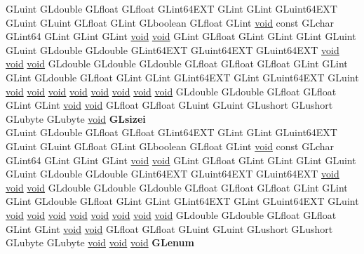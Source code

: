 \begin{DoxyCompactItemize}
\begin{tabbing}
\>GLuint GLdouble GLfloat GLfloat GLint64EXT GLint GLint GLuint64EXT GLuint GLuint GLfloat GLint GLboolean GLfloat GLint \hyperlink{interfacevoid}{void} const GLchar GLint64 GLint GLint GLint \hyperlink{interfacevoid}{void} \hyperlink{interfacevoid}{void} GLint GLfloat GLint GLint GLint GLuint GLuint GLdouble GLdouble GLint64EXT GLuint64EXT GLuint64EXT \hyperlink{interfacevoid}{void} \hyperlink{interfacevoid}{void} \hyperlink{interfacevoid}{void} GLdouble GLdouble GLdouble GLfloat GLfloat GLfloat GLint GLint GLint GLdouble GLfloat GLint GLint GLint64EXT GLint GLuint64EXT GLuint \hyperlink{interfacevoid}{void} \hyperlink{interfacevoid}{void} \hyperlink{interfacevoid}{void} \hyperlink{interfacevoid}{void} \hyperlink{interfacevoid}{void} \hyperlink{interfacevoid}{void} \hyperlink{interfacevoid}{void} \hyperlink{interfacevoid}{void} GLdouble GLdouble GLfloat GLfloat GLint GLint \hyperlink{interfacevoid}{void} \hyperlink{interfacevoid}{void} GLfloat GLfloat GLuint GLuint GLushort GLushort GLubyte GLubyte \hyperlink{interfacevoid}{void} {\bfseries GLsizei}\\
\>GLuint GLdouble GLfloat GLfloat GLint64EXT GLint GLint GLuint64EXT GLuint GLuint GLfloat GLint GLboolean GLfloat GLint \hyperlink{interfacevoid}{void} const GLchar GLint64 GLint GLint GLint \hyperlink{interfacevoid}{void} \hyperlink{interfacevoid}{void} GLint GLfloat GLint GLint GLint GLuint GLuint GLdouble GLdouble GLint64EXT GLuint64EXT GLuint64EXT \hyperlink{interfacevoid}{void} \hyperlink{interfacevoid}{void} \hyperlink{interfacevoid}{void} GLdouble GLdouble GLdouble GLfloat GLfloat GLfloat GLint GLint GLint GLdouble GLfloat GLint GLint GLint64EXT GLint GLuint64EXT GLuint \hyperlink{interfacevoid}{void} \hyperlink{interfacevoid}{void} \hyperlink{interfacevoid}{void} \hyperlink{interfacevoid}{void} \hyperlink{interfacevoid}{void} \hyperlink{interfacevoid}{void} \hyperlink{interfacevoid}{void} \hyperlink{interfacevoid}{void} GLdouble GLdouble GLfloat GLfloat GLint GLint \hyperlink{interfacevoid}{void} \hyperlink{interfacevoid}{void} GLfloat GLfloat GLuint GLuint GLushort GLushort GLubyte GLubyte \hyperlink{interfacevoid}{void} \hyperlink{interfacevoid}{void} \hyperlink{interfacevoid}{void} {\bfseries GLenum}\\

\end{tabbing}
\end{DoxyCompactItemize}
